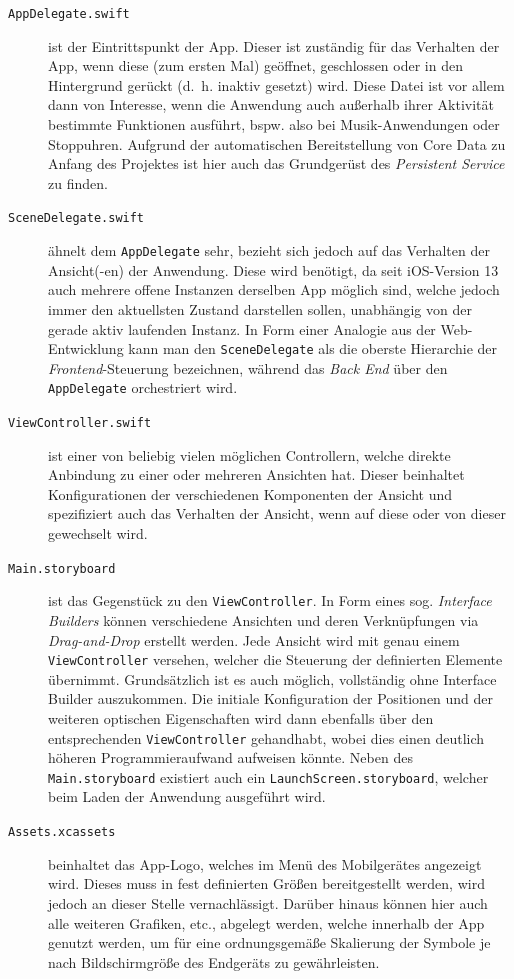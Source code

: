 \begin{description}
	\item[\texttt{AppDelegate.swift}] ist der Eintrittspunkt der App. Dieser ist zuständig für das Verhalten der App, wenn diese (zum ersten Mal) geöffnet, geschlossen oder in den Hintergrund gerückt (d.\ h. inaktiv gesetzt) wird. Diese Datei ist vor allem dann von Interesse, wenn die Anwendung auch außerhalb ihrer Aktivität bestimmte Funktionen ausführt, bspw. also bei Musik-Anwendungen oder Stoppuhren. Aufgrund der automatischen Bereitstellung von Core Data zu Anfang des Projektes ist hier auch das Grundgerüst des \textit{Persistent Service} zu finden.
	\item[\texttt{SceneDelegate.swift}] ähnelt dem \texttt{AppDelegate} sehr, bezieht sich jedoch auf das Verhalten der Ansicht(-en) der Anwendung. Diese wird benötigt, da seit iOS-Version 13 auch mehrere offene Instanzen derselben App möglich sind, welche jedoch immer den aktuellsten Zustand darstellen sollen, unabhängig von der gerade aktiv laufenden Instanz. In Form einer Analogie aus der Web-Entwicklung kann man den \texttt{SceneDelegate} als die oberste Hierarchie der \textit{Frontend}-Steuerung bezeichnen, während das \textit{Back End} über den \texttt{AppDelegate} orchestriert wird.
	\item[\texttt{ViewController.swift}] ist einer von beliebig vielen möglichen Controllern, welche direkte Anbindung zu einer oder mehreren Ansichten hat. Dieser beinhaltet Konfigurationen der verschiedenen Komponenten der Ansicht und spezifiziert auch das Verhalten der Ansicht, wenn auf diese oder von dieser gewechselt wird.
	\item[\texttt{Main.storyboard}] ist das Gegenstück zu den \texttt{ViewController}. In Form eines sog. \textit{Interface Builders} können verschiedene Ansichten und deren Verknüpfungen via \textit{Drag-and-Drop} erstellt werden. Jede Ansicht wird mit genau einem \texttt{ViewController} versehen, welcher die Steuerung der definierten Elemente übernimmt. Grundsätzlich ist es auch möglich, vollständig ohne Interface Builder auszukommen. Die initiale Konfiguration der Positionen und der weiteren optischen Eigenschaften wird dann ebenfalls über den entsprechenden \texttt{ViewController} gehandhabt, wobei dies einen deutlich höheren Programmieraufwand aufweisen könnte. Neben des \texttt{Main.storyboard} existiert auch ein \texttt{LaunchScreen.storyboard}, welcher beim Laden der Anwendung ausgeführt wird.
	\item[\texttt{Assets.xcassets}] beinhaltet das App-Logo, welches im Menü des Mobilgerätes angezeigt wird. Dieses muss in fest definierten Größen bereitgestellt werden, wird jedoch an dieser Stelle vernachlässigt. Darüber hinaus können hier auch alle weiteren Grafiken, etc., abgelegt werden, welche innerhalb der App genutzt werden, um für eine ordnungsgemäße Skalierung der Symbole je nach Bildschirmgröße des Endgeräts zu gewährleisten.

\end{description}
